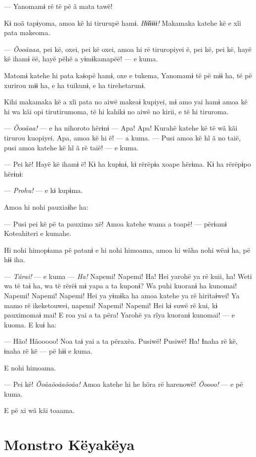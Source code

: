 --- Yanomamɨ rë të pë ã mata tawë! 

Kɨ noã tapɨyoma, amoa kë hi tirurupë hamɨ. \textit{Hɨ̃ɨɨɨɨɨ! }Makamaka katehe kë e
xĩi pata makeoma. 

--- \textit{Õooãaaa}, pei kë, oxei, pei kë oxei, amoa hi rë tiruropiyei ë, pei
kë, pei kë, hayë kë ihamɨ ëë, hayë pëhë a yɨmɨkamapëë! --- e kuma. 

Matomɨ katehe hi pata kaɨopë hamɨ, oxe e tukema, Yanomamɨ të pë mɨɨ ha,
të pë xurirou mɨɨ ha, e ha tuikunɨ, e ha tirehetarunɨ. 

Kihi makamaka kë a xĩi pata no aiwë makeaɨ kupiyei, mɨ amo yai hamɨ amoa
kë hi wa kãi opi tirutirumoma, të hi kahikɨ no aiwë no kirii, e të hi
tiruroma. 

--- \textit{Õooãaa!} --- e ha nihoroto hërɨnɨ --- Apa! Apa! Kurahë katehe kë të
wã kãi tirurou kuopiyei. Apa, amoa kë hi ë! --- a kuma. --- Pusi amoa kë
hĩ ã no taië, pusi amoa katehe kë hĩ ã rë taië! --- e kuma. 

--- Pei kë! Hayë kë ihamɨ ë! Kɨ ha kupɨnɨ, kɨ rërëpɨa xoape hërɨma. Kɨ
ha rërëpɨpo hërɨnɨ: 

--- \textit{Prohu!} --- e kɨ kupɨma. 

Amoa hi nohi pauxiaɨhe ha: 

--- Pusi pei kë pë ta pauximo xë! Amoa katehe wama a toapë! --- përɨamɨ
Koteahiteri e kumahe. 

Hi nohi himopɨama pë patanɨ e hi nohi himoama, amoa hi wãha nohi wëaɨ
ha, pë hɨɨ iha. 

--- \textit{Tãrai!} --- e kuma --- \textit{Ha!} Napemi! Napemi! Ha! Hei yarohë ya rë kuii,
ha! Weti wa të taɨ ha, wa të rërëɨ mɨ yapa a ta kuponɨ? Wa puhi kuoranɨ
ha kunomai! Napemi! Napemi! Napemi! Hei ya yɨmɨka ha amoa katehe ya rë
hiritaɨwei! Ya mamo rë ikeketouwei, napemi! Napemi! Napemi! Hei kɨ suwë
rë kui, kɨ pauximomaɨ mai! E roa yai a ta përa! Yarohë ya rĩya kuoranɨ
kunomai! --- e kuoma. E kuɨ ha: 

--- Hão! Hãooooo! Noa taɨ yai a ta përaxëa. Pusiwë! Pusiwë! Ha! Ɨnaha rë
kë, ɨnaha rë kë --- pë hɨɨ e kuma. 

E nohi himoama. 

--- Pei kë! \textit{Õoãaõoãaõoãa!} Amoa katehe hi he hõra rë harenowë! \textit{Õoooo!} ---
e pë kuma. 

E pë xi wã kãi toaama.

\chapter{Monstro Këyakëya}
 
